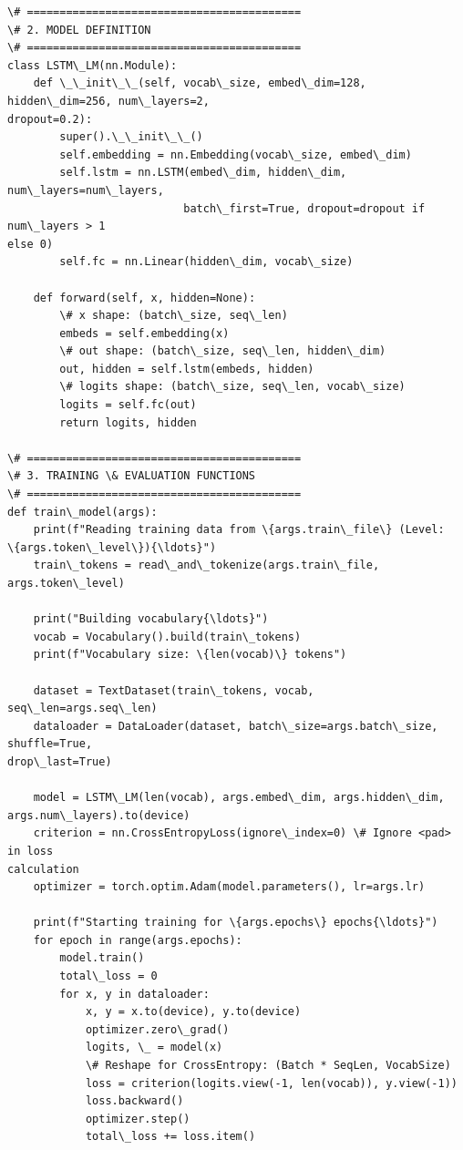 \documentclass[11pt]{article}
\begin{document}
\begin{Verbatim}[commandchars=\\\{\}]
\# ==========================================
\# 2. MODEL DEFINITION
\# ==========================================
class LSTM\_LM(nn.Module):
    def \_\_init\_\_(self, vocab\_size, embed\_dim=128, hidden\_dim=256, num\_layers=2,
dropout=0.2):
        super().\_\_init\_\_()
        self.embedding = nn.Embedding(vocab\_size, embed\_dim)
        self.lstm = nn.LSTM(embed\_dim, hidden\_dim, num\_layers=num\_layers,
                           batch\_first=True, dropout=dropout if num\_layers > 1
else 0)
        self.fc = nn.Linear(hidden\_dim, vocab\_size)

    def forward(self, x, hidden=None):
        \# x shape: (batch\_size, seq\_len)
        embeds = self.embedding(x)
        \# out shape: (batch\_size, seq\_len, hidden\_dim)
        out, hidden = self.lstm(embeds, hidden)
        \# logits shape: (batch\_size, seq\_len, vocab\_size)
        logits = self.fc(out)
        return logits, hidden

\# ==========================================
\# 3. TRAINING \& EVALUATION FUNCTIONS
\# ==========================================
def train\_model(args):
    print(f"Reading training data from \{args.train\_file\} (Level:
\{args.token\_level\}){\ldots}")
    train\_tokens = read\_and\_tokenize(args.train\_file, args.token\_level)

    print("Building vocabulary{\ldots}")
    vocab = Vocabulary().build(train\_tokens)
    print(f"Vocabulary size: \{len(vocab)\} tokens")

    dataset = TextDataset(train\_tokens, vocab, seq\_len=args.seq\_len)
    dataloader = DataLoader(dataset, batch\_size=args.batch\_size, shuffle=True,
drop\_last=True)

    model = LSTM\_LM(len(vocab), args.embed\_dim, args.hidden\_dim,
args.num\_layers).to(device)
    criterion = nn.CrossEntropyLoss(ignore\_index=0) \# Ignore <pad> in loss
calculation
    optimizer = torch.optim.Adam(model.parameters(), lr=args.lr)

    print(f"Starting training for \{args.epochs\} epochs{\ldots}")
    for epoch in range(args.epochs):
        model.train()
        total\_loss = 0
        for x, y in dataloader:
            x, y = x.to(device), y.to(device)
            optimizer.zero\_grad()
            logits, \_ = model(x)
            \# Reshape for CrossEntropy: (Batch * SeqLen, VocabSize)
            loss = criterion(logits.view(-1, len(vocab)), y.view(-1))
            loss.backward()
            optimizer.step()
            total\_loss += loss.item()


\end{Verbatim}
\end{document}
